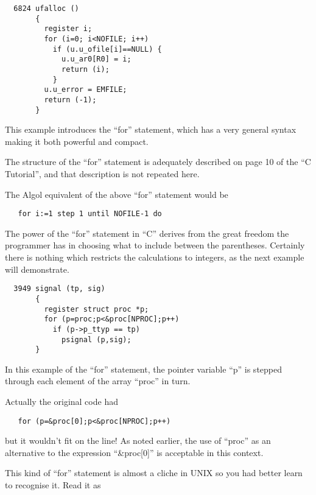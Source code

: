 
\begin{verbatim}
  6824 ufalloc ()
       {
         register i;
         for (i=0; i<NOFILE; i++)
           if (u.u_ofile[i]==NULL) {
             u.u_ar0[R0] = i;
             return (i);
           }
         u.u_error = EMFILE;
         return (-1);
       }
\end{verbatim}

This example introduces the ``for''
statement, which has a very general
syntax making it both powerful and compact.

The structure of the ``for'' statement is
adequately described on page 10 of the
``C Tutorial'', and that description is
not repeated here.

The Algol equivalent of the above ``for''
statement would be

\begin{verbatim}
   for i:=1 step 1 until NOFILE-1 do
\end{verbatim}

The power of the ``for'' statement in ``C''
derives from the great freedom the programmer
has in choosing what to include
between the parentheses. Certainly
there is nothing which restricts the
calculations to integers, as the next
example will demonstrate.



\begin{verbatim}
  3949 signal (tp, sig)
       {
         register struct proc *p;
         for (p=proc;p<&proc[NPROC];p++)
           if (p->p_ttyp == tp)
             psignal (p,sig);
       }
\end{verbatim}


In this example of the ``for'' statement,
the pointer variable ``p'' is stepped
through each element of the array
``proc'' in turn.

Actually the original code had

\begin{verbatim}
   for (p=&proc[0];p<&proc[NPROC];p++)
\end{verbatim}

\noindent but it wouldn't fit on the line! As
noted earlier, the use of ``proc'' as an
alternative to the expression
``\&proc[0]'' is acceptable in this context.

This kind of ``for'' statement is almost
a cliche in UNIX so you had better
learn to recognise it. Read it as

\medskip

